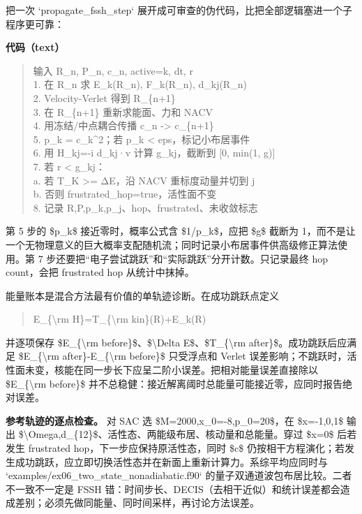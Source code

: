 \documentclass[UTF8,openany,11pt,fontset=fandol]{ctexbook}
\begin{document}
把一次 `propagate\_fssh\_step`
展开成可审查的伪代码，比把全部逻辑塞进一个子程序更可靠：

\textbf{代码（text）}

\begin{quote}
输入 R\_n, P\_n, c\_n, active=k, dt, r\\
1. 在 R\_n 求 E\_k(R\_n), F\_k(R\_n), d\_kj(R\_n)\\
2. Velocity-Verlet 得到 R\_\{n+1\}\\
3. 在 R\_\{n+1\} 重新求能面、力和 NACV\\
4. 用冻结/中点耦合传播 c\_n -\textgreater{} c\_\{n+1\}\\
5. p\_k = \textbar c\_k\textbar\^{}2；若 p\_k \textless{}
eps，标记小布居事件\\
6. 用 H\_kj=-i d\_kj·v 计算 g\_kj，截断到 {[}0, min(1, g){]}\\
7. 若 r \textless{} g\_kj：\\
a. 若 T\_K \textgreater= ΔE，沿 NACV 重标度动量并切到 j\\
b. 否则 frustrated\_hop=true，活性面不变\\
8. 记录 R,P,p\_k,p\_j、hop、frustrated、未收敛标志
\end{quote}

第 5 步的 \$p\_k\$ 接近零时，概率公式含 \$1/p\_k\$，应把 \$g\$ 截断为
1，而不是让一个无物理意义的巨大概率支配随机流；同时记录小布居事件供高级修正算法使用。第
7 步还要把``电子尝试跳跃''和``实际跳跃''分开计数。只记录最终 hop
count，会把 frustrated hop 从统计中抹掉。

能量账本是混合方法最有价值的单轨迹诊断。在成功跳跃点定义

\begin{quote}
E\_\{\textbackslash rm H\}=T\_\{\textbackslash rm kin\}(R)+E\_k(R)
\end{quote}

并逐项保存 \$E\_\{\textbackslash rm before\}\$、\$\textbackslash Delta
E\$、\$T\_\{\textbackslash rm after\}\$。成功跳跃后应满足
\$\textbar E\_\{\textbackslash rm after\}-E\_\{\textbackslash rm
before\}\textbar\$ 只受浮点和 Verlet
误差影响；不跳跃时，活性面未变，核能在同一步长下应呈二阶小误差。把相对能量误差直接除以
\$E\_\{\textbackslash rm before\}\$
并不总稳健：接近解离阈时总能量可能接近零，应同时报告绝对误差。

\textbf{参考轨迹的逐点检查。} 对 SAC 选 \$M=2000,x\_0=-8,p\_0=20\$，在
\$x=-1,0,1\$ 输出
\$\textbackslash Omega,d\_\{12\}\$、活性态、两能级布居、核动量和总能量。穿过
\$x=0\$ 后若发生 frustrated hop，下一步应保持原活性态，同时 \$c\$
仍按相干方程演化；若发生成功跳跃，应立即切换活性态并在新面上重新计算力。系综平均应同时与
`examples/ex06\_two\_state\_nonadiabatic.f90`
的量子双通道波包布居比较。二者不一致不一定是 FSSH
错：时间步长、DECIS（去相干近似）和统计误差都会造成差别；必须先做同能量、同时间采样，再讨论方法误差。
\end{document}
